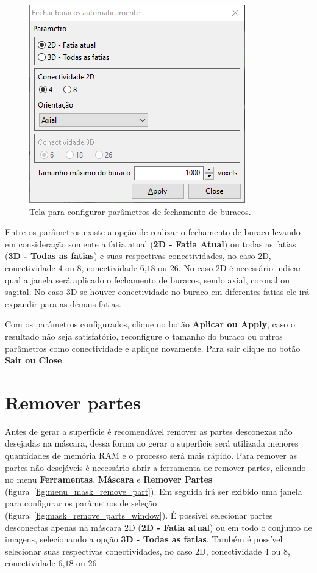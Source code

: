 \begin{figure}[!htb]
\centering
\includegraphics[scale=0.7]{../user_guide_figures/invesalius_screen/mask_automatic_fill_holes_window_pt.png}
\caption{Tela para configurar parâmetros de fechamento de buracos.}
\label{fig:mask_automatic_fill_holes_window}
\end{figure}

Entre os parâmetros existe a opção de realizar o fechamento de buraco levando em consideração somente a fatia atual (\textbf{2D - Fatia Atual}) ou todas as fatias (\textbf{3D - Todas as fatias}) e suas respectivas conectividades, no caso 2D, conectividade $4$ ou $8$, conectividade $6$,$18$ ou $26$. No caso 2D é necessário indicar qual a janela será aplicado o fechamento de buracos, sendo axial, coronal ou sagital. No caso 3D se houver conectividade no buraco em diferentes fatias ele irá expandir para as demais fatias. 

Com os parâmetros configurados, clique no botão \textbf{Aplicar ou Apply}, caso o resultado não seja satisfatório, reconfigure o tamanho do buraco ou outros parâmetros como conectividade e aplique novamente. Para sair clique no botão \textbf{Sair ou Close}.

\section{Remover partes}

Antes de gerar a superfície é recomendável remover as partes desconexas não desejadas na máscara, dessa forma ao gerar a superfície será utilizada menores quantidades de memória RAM e o processo será mais rápido. Para remover as partes não desejáveis é necessário abrir a ferramenta de remover partes, clicando no menu \textbf{Ferramentas}, \textbf{Máscara} e \textbf{Remover Partes} (figura~\ref{fig:menu_mask_remove_part}). Em seguida irá ser exibido uma janela para configurar os parâmetros de seleção (figura~\ref{fig:mask_remove_parts_window}). É possível selecionar partes desconectas apenas na máscara 2D (\textbf{2D - Fatia atual}) ou em todo o conjunto de imagens, selecionando a opção \textbf{3D - Todas as fatias}. Também é possível selecionar suas respectivas conectividades, no caso 2D, conectividade $4$ ou $8$, conectividade $6$,$18$ ou $26$.

